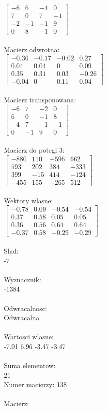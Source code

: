 \documentclass[a4paper,12pt]{article}
\begin{document}
$\begin{bmatrix} -6&6&-4&0\\7&0&7&-1\\-2&-1&-1&9\\0&8&-1&0 \end{bmatrix}$
\\
\\
Macierz odwrotna:\\

$\begin{bmatrix} -0.36&-0.17&-0.02&0.27\\0.04&0.04&0&0.09\\0.35&0.31&0.03&-0.26\\-0.04&0&0.11&0.04 \end{bmatrix}$
\\
\\
Macierz transponowana:\\

$\begin{bmatrix} -6&7&-2&0\\6&0&-1&8\\-4&7&-1&-1\\0&-1&9&0 \end{bmatrix}$
\\
\\
Macierz do potegi 3:\\

$\begin{bmatrix} -880&110&-596&662\\593&202&384&-333\\399&-15&414&-124\\-455&155&-265&512 \end{bmatrix}$
\\
\\
Wektory wlasne:\\

$\begin{bmatrix} -0.78&0.09&-0.54&-0.54\\0.37&0.58&0.05&0.05\\0.36&0.56&0.64&0.64\\-0.37&0.58&-0.29&-0.29 \end{bmatrix}$
\\
\\
Slad:\\
-7
\\
\\
Wyznacznik:\\
-1384
\\
\\
Odwracalnosc:\\
Odwracalna
\\
\\
Wartosci wlasne:\\
-7.01 6.96 -3.47 -3.47
\\
\\
Suma elementow:\\
21
\\
\newpage
Numer macierzy:
138
\\
\\
Macierz:\\
\end{document}
